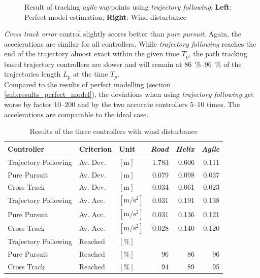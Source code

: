 \begin{figure}[H]
\begin{minipage}[t]{0.48\textwidth}
  \end{minipage}
	\caption{Result of tracking \textit{agile} waypoints using \textit{trajectory following}; \textbf{Left}: Perfect model estimation; \textbf{Right}: Wind disturbance}
	\label{fig:result_wind_trajfoll}
\end{figure}



\textit{Cross track error} control slightly scores better than \textit{pure pursuit}. Again, the accelerations are similar for all controllers. While \textit{trajectory following} reaches the end of the trajectory almost exact within the given time $T_p$, the path tracking based trajectory controllers are slower and will remain at \SIrange{86}{96}{\percent} of the trajectories length $L_p$ at the time $T_p$. \\
Compared to the results of perfect modelling (section \ref{sub:results_perfect_model}), the deviations when using \textit{trajectory following} get worse by factor \numrange{10}{200} and by the two accurate controllers \numrange{5}{10} times. The accelerations are comparable to the ideal case.

\begin{table}[h]
\begin{center}
 \begin{tabular}{lll|rrr}
 \hline
 Controller & Criterion & Unit & \textit{Road} & \textit{Helix} & \textit{Agile} \\ \hline \hline
 Trajectory Following & Av. Dev. & $[\si{\meter}]$ & 1.783 & 0.606 & 0.111 \\
 Pure Pursuit         & Av. Dev. & $[\si{\meter}]$ & 0.079 & 0.098 & 0.037 \\
 Cross Track          & Av. Dev. & $[\si{\meter}]$ & 0.034 & 0.061 & 0.023 \\

 Trajectory Following & Av. Acc. & $[\si{\meter\per\square\second}]$ & 0.031 & 0.191 & 0.138 \\
 Pure Pursuit         & Av. Acc. & $[\si{\meter\per\square\second}]$ & 0.031 & 0.136 & 0.121 \\
 Cross Track          & Av. Acc. & $[\si{\meter\per\square\second}]$ & 0.028 & 0.140 & 0.120 \\
 
 Trajectory Following & Reached & $[\si{\percent}]$ & \ktilde100 & \ktilde100 & \ktilde100 \\
 Pure Pursuit         & Reached & $[\si{\percent}]$ &  96 &  86 &  96 \\
 Cross Track          & Reached & $[\si{\percent}]$ &  94 &  89 &  95 \\
 \hline
 \end{tabular}
 \caption{Results of the three controllers with wind disturbance}\vspace{1px}
 \label{tab:results_wind_disturbance}
\end{center}
\end{table}


